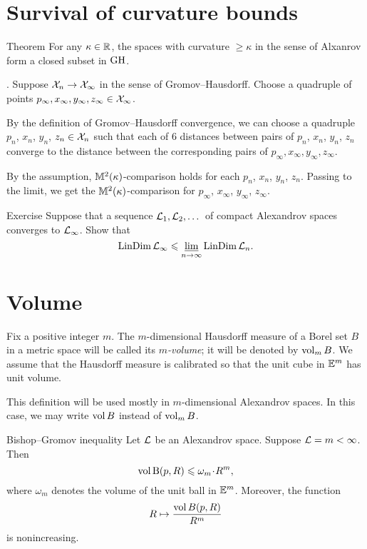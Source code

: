 \section{Survival of curvature bounds}

\begin{thm}{Theorem}\label{thm:CBB-closed}
For any $\kappa\in\mathbb{R}$, the spaces with curvature $\ge\kappa$ in the sense of Alxanrov form a closed subset in $\operatorname{\rm GH}\nolimits$.
\end{thm}

.
Suppose $\mathcal{X}_n\to\mathcal{X}_\infty$ in the sense of Gromov--Hausdorff.
Choose a quadruple of points $p_\infty, x_\infty,y_\infty,z_\infty\in \mathcal{X}_\infty$.

By the definition of Gromov--Hausdorff convergence, we can choose a quadruple $p_n$,  $x_n$, $y_n$, $z_n\in \mathcal{X}_n$ such that each of 6 distances between pairs of $p_n$, $x_n$, $y_n$, $z_n$ converge to the distance between the corresponding pairs of $p_\infty, x_\infty,y_\infty,z_\infty$.

By the assumption, $\mathbb{M}^2(\kappa)$-comparison holds for each $p_n$, $x_n$, $y_n$, $z_n$.
Passing to the limit, we get the $\mathbb{M}^2(\kappa)$-comparison for $p_\infty$,  $x_\infty$, $y_\infty$, $z_\infty$.
\qeds

\begin{thm}{Exercise}\label{ex:dim-lim}
Suppose that a sequence $\mathcal{L}_1,\mathcal{L}_2,\dots$ of compact Alexandrov spaces converges to $\mathcal{L}_\infty$.
Show that
\[\mathop{\rm LinDim}\nolimits \mathcal{L}_\infty\leqslant \varliminf_{n\to\infty} \mathop{\rm LinDim}\nolimits \mathcal{L}_n.\]
\end{thm}


\section{Volume}

Fix a positive integer $m$.
The $m$-dimensional Hausdorff measure of a Borel set $B$ in a metric space will be called its \emph{$m$-volume}; it will be denoted by $\operatorname{\rm vol}\nolimits_m B$.
We assume that the Hausdorff measure is calibrated so that the unit cube in $\mathbb{E}^m$ has unit volume.

This definition will be used mostly in $m$-dimensional Alexandrov spaces.
In this case, we may write $\operatorname{\rm vol}\nolimits B$ instead of $\operatorname{\rm vol}\nolimits_m B$.


\begin{thm}{Bishop--Gromov inequality}\label{inq:BG}
Let $\mathcal{L}$ be an Alexandrov space.
Suppose $\mathcal{L}=m<\infty$.
Then 
\[\vol \oBall(p,R)\le \omega_m\cdot R^m,\]
where $\omega_m$ denotes the volume of the unit ball in $\mathbb{E}^m$.
Moreover, the function 
\[R\mapsto \frac{\operatorname{\rm vol}\nolimits B(p,R)}{R^m}\]
is nonincreasing.
\end{thm}

